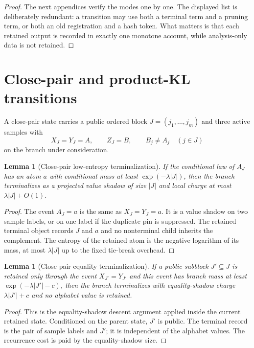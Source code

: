 \documentclass[11pt]{article}
\newtheorem{lemma}[theorem]{Lemma}
\theoremstyle{remark}
\begin{document}
\begin{proof}
The next appendices verify the modes one by one.  The displayed list is deliberately redundant: a transition may use both a terminal term and a pruning term, or both an old registration and a hash token.  What matters is that each retained output is recorded in exactly one monotone account, while analysis-only data is not retained.
\end{proof}

\section{Close-pair and product-KL transitions}\label{app:close-product}

A close-pair state carries a public ordered block $J=(j_1,\ldots,j_m)$ and three active samples with
\[
        X_J=Y_J=A,
        \qquad Z_J=B,
        \qquad B_j\ne A_j\quad (j\in J)
\]
on the branch under consideration.

\begin{lemma}[Close-pair low-entropy terminalization]\label{lem:app-low-entropy}
If the conditional law of $A_J$ has an atom $a$ with conditional mass at least $\exp(-\lambda |J|)$, then the branch terminalizes as a projected value shadow of size $|J|$ and local charge at most $\lambda |J|+O(1)$.
\end{lemma}

\begin{proof}
The event $A_J=a$ is the same as $X_J=Y_J=a$.  It is a value shadow on two sample labels, or on one label if the duplicate pin is suppressed.  The retained terminal object records $J$ and $a$ and no nonterminal child inherits the complement.  The entropy of the retained atom is the negative logarithm of its mass, at most $\lambda |J|$ up to the fixed tie-break overhead.
\end{proof}

\begin{lemma}[Close-pair equality terminalization]\label{lem:app-equality-terminal}
If a public subblock $J'\subseteq J$ is retained only through the event $X_{J'}=Y_{J'}$ and this event has branch mass at least $\exp(-\lambda |J'|-c)$, then the branch terminalizes with equality-shadow charge $\lambda |J'|+c$ and no alphabet value is retained.
\end{lemma}

\begin{proof}
This is the equality-shadow descent argument applied inside the current retained state.  Conditioned on the parent state, $J'$ is public.  The terminal record is the pair of sample labels and $J'$; it is independent of the alphabet values.  The recurrence cost is paid by the equality-shadow size.
\end{proof}
\end{document}
